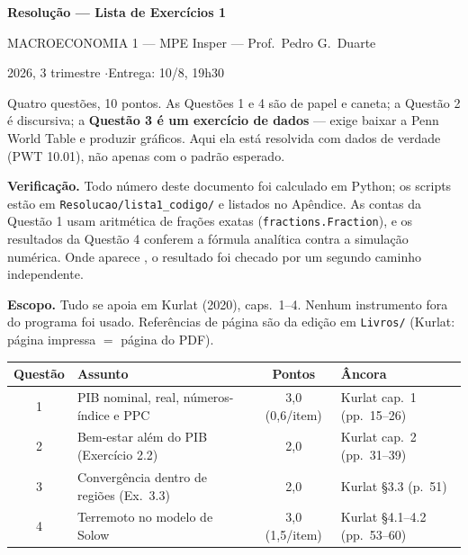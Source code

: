 \documentclass[11pt, a4paper]{article}
\begin{document}
\begin{center}
{\LARGE\bfseries\color{darkblue} Resolução --- Lista de Exercícios 1\par}
\vspace{4pt}
{\large MACROECONOMIA 1 --- MPE Insper --- Prof.\ Pedro G.\ Duarte\par}
\vspace{2pt}
{\normalsize 2026, 3\textordmasculine{} trimestre \quad$\cdot$\quad Entrega: 10/8, 19h30\par}
\end{center}
\vspace{6pt}

\begin{tcolorbox}[theorybox, title={Como ler este documento}]
\small
Quatro questões, 10 pontos. As Questões 1 e 4 são de papel e caneta; a Questão 2 é
discursiva; a \textbf{Questão 3 é um exercício de dados} --- exige baixar a Penn World
Table e produzir gráficos. Aqui ela está resolvida com dados de verdade (PWT 10.01),
não apenas com o padrão esperado.

\smallskip
\textbf{Verificação.} Todo número deste documento foi calculado em Python; os scripts
estão em \texttt{Resolucao/lista1\_codigo/} e listados no Apêndice. As contas
da Questão 1 usam aritmética de frações exatas (\texttt{fractions.Fraction}), e os
resultados da Questão 4 conferem a fórmula analítica contra a simulação numérica. Onde
aparece \checkmark, o resultado foi checado por um segundo caminho independente.

\smallskip
\textbf{Escopo.} Tudo se apoia em Kurlat (2020), caps.\ 1--4. Nenhum instrumento fora do
programa foi usado. Referências de página são da edição em \texttt{Livros/}
(Kurlat: página impressa $=$ página do PDF).
\end{tcolorbox}

\vspace{4pt}
\begin{center}
\small
\begin{tabular}{clcl}
\toprule
\textbf{Questão} & \textbf{Assunto} & \textbf{Pontos} & \textbf{Âncora} \\
\midrule
1 & PIB nominal, real, números-índice e PPC & 3,0 (0,6/item) & Kurlat cap.\ 1 (pp.\ 15--26) \\
2 & Bem-estar além do PIB (Exercício 2.2)   & 2,0            & Kurlat cap.\ 2 (pp.\ 31--39) \\
3 & Convergência dentro de regiões (Ex.\ 3.3) & 2,0          & Kurlat §3.3 (p.\ 51) \\
4 & Terremoto no modelo de Solow            & 3,0 (1,5/item) & Kurlat §4.1--4.2 (pp.\ 53--60) \\
\bottomrule
\end{tabular}
\end{center}
\end{document}
